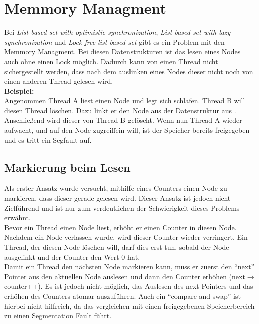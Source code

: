 \section{Memmory Managment}\label{sec:mem}
Bei \textit{List-based set with optimistic synchronization}, \textit{List-based set with lazy synchronization} und \textit{Lock-free list-based set}
gibt es ein Problem mit den Memmory Managment. Bei diesen Datenstrukturen ist das lesen eines Nodes auch ohne einen Lock möglich. 
Dadurch kann von einen Thread nicht sichergestellt werden, dass nach dem auslinken eines Nodes dieser nicht noch von einen anderen Thread gelesen wird.
\\ 
\textbf{Beispiel:}
\\ Angenommen Thread A liest einen Node und legt sich schlafen. Thread B will diesen Thread löschen. Dazu linkt er den Node aus der Datenstruktur aus
. Anschließend wird dieser von Thread B gelöscht. Wenn nun Thread A wieder aufwacht, und auf den Node zugreiffein will, ist der Speicher bereits freigegeben
und es tritt ein Segfault auf. 

\subsection{Markierung beim Lesen}
Als erster Ansatz wurde versucht, mithilfe eines Counters einen Node zu markieren, dass dieser gerade gelesen wird. Dieser Ansatz ist jedoch nicht 
Zielführend und ist nur zum verdeutlichen der Schwierigkeit dieses Problems erwähnt. \\
Bevor ein Thread einen Node liest, erhöht er einen Counter in diesen Node. Nachdem ein Node verlassen wurde, wird dieser Counter wieder verringert.
Ein Thread, der diesen Node löschen will, darf dies erst tun, sobald der Node ausgelinkt und der Counter den Wert 0 hat. \\
Damit ein Thread den nächsten Node markieren kann, muss er zuerst den ``next'' Pointer aus den aktuellen Node auslesen und dann den Counter erhöhen (next$\rightarrow$counter++).
Es ist jedoch nicht möglich, das Auslesen des next Pointers und das erhöhen des Counters atomar auszuführen. Auch ein ``compare and swap'' ist hierbei nicht hilfreich,
da das vergleichen mit einen freigegebenen Speicherbereich zu einen Segmentation Fault führt. 


